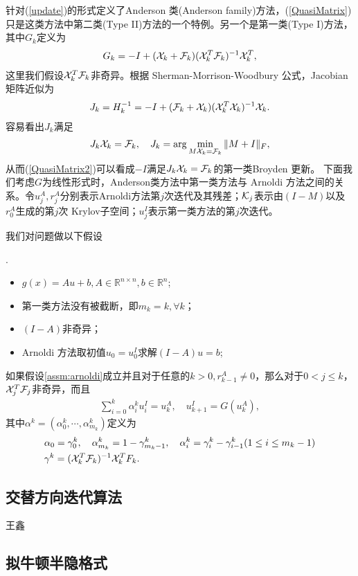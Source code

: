 	\cite{fang}针对(\ref{update})的形式定义了Anderson 类(Anderson family)方法，(\ref{QuasiMatrix})只是这类方法中第二类(Type II)方法的一个特例。另一个是第一类(Type I)方法，其中$ G_k $定义为
	\begin{align}
	G_k = - I + (\mathcal{X}_k + \mathcal{F}_k)(\mathcal{X}_k^T\mathcal{F}_k)^{-1}\mathcal{X}_k^T,
	\end{align}
	这里我们假设$ \mathcal{X}_k^T\mathcal{F}_k $非奇异。根据 Sherman-Morrison-Woodbury 公式，Jacobian矩阵近似为
	\begin{align}
	J_k = H_k^{-1} = -I + (\mathcal{F}_k + \mathcal{X}_k)(\mathcal{X}_k^T\mathcal{X}_k)^{-1}\mathcal{X}_k.
	\label{QuasiMatrix2}
	\end{align}
	容易看出$ J_k $满足
	\begin{align}
	J_k\mathcal{X}_k = \mathcal{F}_k,\quad J_k = \arg\min_{M\mathcal{X}_k = \mathcal{F}_k}\|M+I\|_F,
	\end{align}
	从而(\ref{QuasiMatrix2})可以看成$ -I $满足$ J_k\mathcal{X}_k = \mathcal{F}_k $的第一类Broyden 更新。	下面我们考虑$ G $为线性形式时，Anderson类方法中第一类方法与 Arnoldi 方法之间的关系。令$ u_j^{A} ,r_j^{A}$分别表示Arnoldi方法第$ j $次迭代及其残差；$ \mathcal{K}_j $表示由$ (I-M) $以及$ r_0^{A} $生成的第$ j $次 Krylov子空间；$ u_j^I $表示第一类方法的第$ j $次迭代。
	
	我们对问题做以下假设
	\begin{assumption}.
		\label{assm:arnoldi}
		\begin{itemize}
			\item $ g(x) = Au + b ,A\in\mathbb{R}^{n\times n}, b\in\mathbb{R}^n$;
			\item 第一类方法没有被截断，即$ m_k = k,\forall k $；
			\item $ (I-A) $非奇异；
			\item Arnoldi 方法取初值$ u_0 = u_0^I $求解$ (I-A)u = b $;
		\end{itemize}
	\end{assumption}

	\begin{theorem}
	如果假设\ref{assm:arnoldi}成立并且对于任意的$ k>0,r_{k-1}^A\neq 0 $，那么对于$ 0<j\leq k $，$ \mathcal{X}_j^T\mathcal{F}_j $非奇异，而且
	\begin{align*}
	\sum_{i=0}^k \alpha_i^k u_i^I = u_k^A,\quad u_{k+1}^I = G(u_k^A),
	\end{align*}
	其中$ \alpha^k = (\alpha_0^k,\cdots,\alpha_{m_k}^k) $定义为
	\begin{align*}
	&\alpha_0 = \gamma_0^k,\quad \alpha_{m_k}^k = 1-\gamma_{m_k-1}^k, \quad \alpha_i^k =\gamma_i^k - \gamma_{i-1}^k(1\leq i\leq m_k-1)\\
	&\gamma^k = (\mathcal{X}_k^T\mathcal{F}_k)^{-1}\mathcal{X}_k^TF_k.
	\end{align*}
	\end{theorem}
		
\subsection{交替方向迭代算法}
{\color{red}\begin{center}
    王鑫
\end{center}}

\subsection{拟牛顿半隐格式}
